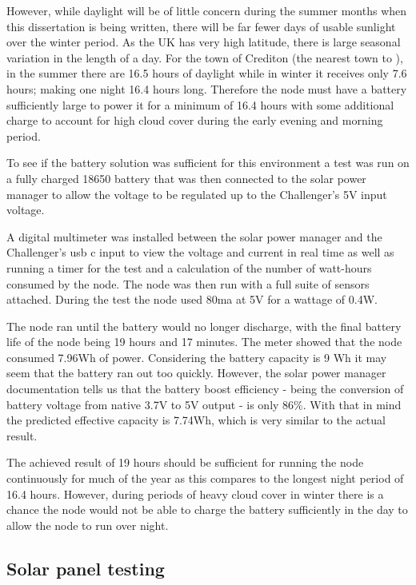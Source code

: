 However, while daylight will be of little concern during the summer months when
this dissertation is being written, there will be far fewer days of usable
sunlight over the winter period. As the UK has very high latitude, there is
large seasonal variation in the length of a day. For the town of Crediton (the
nearest town to \farmName), in the summer there are 16.5 hours of daylight while
in winter it receives only 7.6 hours; making one night 16.4 hours long.
Therefore the node must have a battery sufficiently large to power it for a
minimum of 16.4 hours with some additional charge to account for high cloud
cover during the early evening and morning period.

To see if the battery solution was sufficient for this environment a test was
run on a fully charged 18650 battery that was then connected to the solar power
manager to allow the voltage to be regulated up to the Challenger's 5V input
voltage.

A digital multimeter was installed between the solar power manager and the
Challenger's usb c input to view the voltage and current in real time as well as
running a timer for the test and a calculation of the number of watt-hours
consumed by the node. The node was then run with a full suite of sensors
attached. During the test the node used 80ma at 5V for a wattage of 0.4W.

The node ran until the battery would no longer discharge, with the final battery
life of the node being 19 hours and 17 minutes. The meter showed that the node
consumed 7.96Wh of power. Considering the battery capacity is 9 Wh it may seem
that the battery ran out too quickly. However, the solar power manager
documentation tells us that the battery boost efficiency - being the conversion
of battery voltage from native 3.7V to 5V output - is only 86\%. With that in
mind the predicted effective capacity is 7.74Wh, which is very similar to the
actual result.

The achieved result of 19 hours should be sufficient for running the node
continuously for much of the year as this compares to the longest night period
of 16.4 hours. However, during periods of heavy cloud cover in winter there is a
chance the node would not be able to charge the battery sufficiently in the day
to allow the node to run over night.

\subsection{Solar panel testing}\label{sec:solar-tests}

